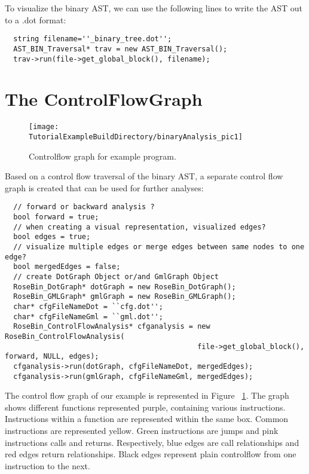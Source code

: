 To visualize the binary AST, we can use the following lines to
write the AST out to a .dot format:

{\mySmallFontSize
\begin{verbatim}
  string filename=''_binary_tree.dot'';
  AST_BIN_Traversal* trav = new AST_BIN_Traversal();
  trav->run(file->get_global_block(), filename);
\end{verbatim}
}


\section{The ControlFlowGraph}

\begin{figure}
\texttt{[image: \\TutorialExampleBuildDirectory/binaryAnalysis\_pic1]}
\caption{Controlflow graph for example program.}
\label{Tutorial:examplefig1}
\end{figure}

Based on a control flow traversal of the binary AST, a separate control flow graph
is created that can be used for further analyses:


{\mySmallFontSize
\begin{verbatim}
  // forward or backward analysis ?
  bool forward = true;
  // when creating a visual representation, visualized edges?
  bool edges = true;
  // visualize multiple edges or merge edges between same nodes to one edge?
  bool mergedEdges = false;
  // create DotGraph Object or/and GmlGraph Object
  RoseBin_DotGraph* dotGraph = new RoseBin_DotGraph();
  RoseBin_GMLGraph* gmlGraph = new RoseBin_GMLGraph();
  char* cfgFileNameDot = ``cfg.dot'';
  char* cfgFileNameGml = ``gml.dot'';
  RoseBin_ControlFlowAnalysis* cfganalysis = new RoseBin_ControlFlowAnalysis(
                                             file->get_global_block(), forward, NULL, edges);
  cfganalysis->run(dotGraph, cfgFileNameDot, mergedEdges);
  cfganalysis->run(gmlGraph, cfgFileNameGml, mergedEdges);
\end{verbatim}
}

The control flow graph of our example is represented in Figure ~\ref{Tutorial:examplefig1}.
The graph shows different functions represented purple, containing various instructions.
Instructions within a function are represented within the same box. Common instructions are
represented yellow. Green instructions are jumps and pink instructions calls and returns.  
Respectively, blue edges are call relationships and red edges return relationships.
Black edges represent plain controlflow from one instruction to the next.



